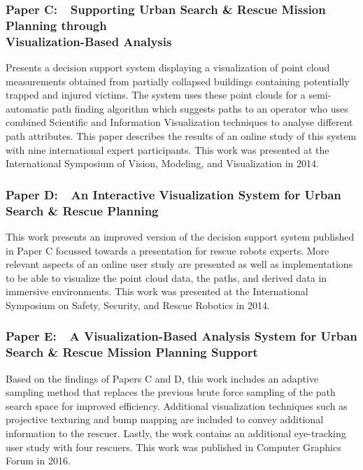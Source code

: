 \subsubsection{Paper C:~~Supporting Urban Search \& Rescue Mission Planning through \\Visualization-Based Analysis}
\vspace*{\absubsubsectionlength}
Presents a decision support system displaying a  visualization of point cloud measurements obtained from partially collapsed buildings containing potentially trapped and injured victims.  The system uses these point clouds for a semi-automatic path finding algorithm which suggests paths to an operator who uses combined Scientific and Information Visualization techniques to analyse different path attributes.  This paper describes the results of an online study of this system with nine international expert participants.  This work was presented at the International Symposium of Vision, Modeling, and Visualization in 2014.

\subsubsection{Paper D:~~An Interactive Visualization System for Urban Search \& Rescue Planning}
\vspace*{\absubsubsectionlength}
This work presents an improved version of the decision support system published in Paper C focussed towards a presentation for rescue robots experts.  More relevant aspects of an online user study are presented as well as implementations to be able to visualize the point cloud data, the paths, and derived data in immersive environments.  This work was presented at the International Symposium on Safety, Security, and Rescue Robotics in 2014.

\subsubsection{Paper E:~~A Visualization-Based Analysis System for Urban Search \& Rescue Mission Planning Support}
\vspace*{\absubsubsectionlength}
Based on the findings of Papers C and D, this work includes an adaptive sampling method that replaces the previous brute force sampling of the path search space for improved efficiency.  Additional visualization techniques such as projective texturing and bump mapping are included to convey additional information to the rescuer.  Lastly, the work contains an additional eye-tracking user study with four rescuers.  This work was published in Computer Graphics Forum in 2016.


